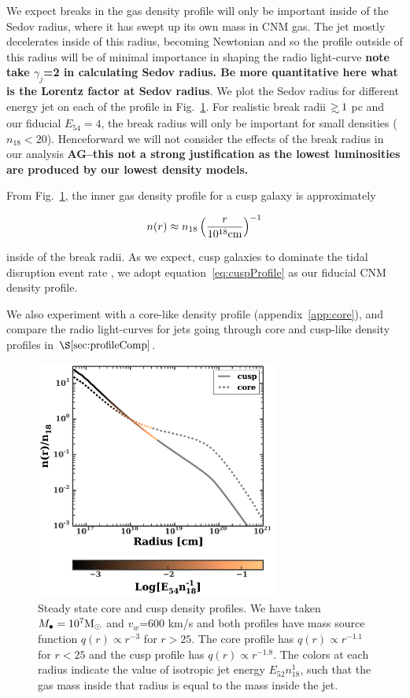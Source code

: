 \documentclass[usenatbib,fleqn]{mnras}
\newcommand\gsim{\mathrel{\rlap{\lower4pt\hbox{\hskip1pt$\sim$}}
    \raise1pt\hbox{$>$}}}
\newcommand{\Mbh}[1][]{M_{\bullet#1}}
\newcommand{\Msun}{{\rm M_\odot}}
\begin{document}
We expect breaks in the gas density profile will only be important
inside of the Sedov radius, where it has swept up its own mass in CNM
gas.  The jet mostly decelerates inside of this radius, becoming
Newtonian and so the profile outside of this radius will be of minimal
importance in shaping the radio light-curve {\bf note take
  $\gamma_j$=2 in calculating Sedov radius. Be more quantitative here
  what is the Lorentz factor at Sedov radius}. We plot the Sedov
radius for different energy jet on each of the profile in
Fig.~\ref{fig:profiles}. For realistic break radii $\gsim 1$ pc and
our fiducial $E_{54}=4$, the break radius will only be important for
small densities ($n_{18}<20$). Henceforward we will not consider the
effects of the break radius in our analysis {\bf AG--this not a strong
  justification as the lowest luminosities are produced by our lowest
  density models.}

From Fig.~\ref{fig:profiles}, the inner gas density profile for a cusp
galaxy is approximately

\begin{equation}
n(r) \approx n_{18} \left(\frac{r}{10^{18} {\rm cm}}\right)^{-1}
\label{eq:cuspProfile}
\end{equation}

inside of the break radii. As we expect, cusp galaxies to dominate the
tidal disruption event rate \citep{Stone&Metzger2015}, we adopt
equation~\eqref{eq:cuspProfile} as our fiducial CNM density profile.

We also experiment with a core-like density profile
(appendix~\ref{app:core}), and compare the radio light-curves for jets
going through core and cusp-like density profiles in
$\S\ref{sec:profileComp}$.


\begin{figure}
\includegraphics[width=8cm]{sedov_radius.pdf}
\caption{\label{fig:profiles} Steady state core and cusp density
  profiles. We have taken $\Mbh=10^{7} \Msun$ and $v_w$=600 km/s and
  both profiles have mass source function $q(r) \propto
  r^{-3}$ for $r > 25$. The core profile has $q(r) \propto
  r^{-1.1}$ for $r < 25$ and the cusp profile has $q(r)
  \propto r^{-1.8}$.  The colors at each radius indicate the value of
  isotropic jet energy $E_{52} n_{18}^{1}$, such that the gas mass
  inside that radius is equal to the mass inside the jet. }
\end{figure}
\end{document}
